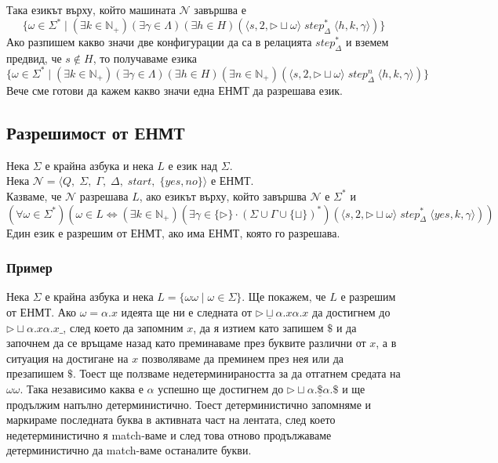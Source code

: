 \documentclass[14pt]{extarticle}
\begin{document}
Така езикът върху, който машината \(\mathcal N\) завършва е
\[ \{ \omega \in \Sigma^* \mid (\exists k \in \mathbb{N}_+)(\exists \gamma \in \Lambda)(\exists h \in H)( \langle s, 2, \triangleright\sqcup\omega \rangle \;step_\Delta^*\; \langle h, k, \gamma \rangle ) \} \]
Ако разпишем какво значи две конфигурации да са в релацията \(step_\Delta^*\) и вземем предвид, че \(s \notin H\), то получаваме езика
\[ \{ \omega \in \Sigma^* \mid (\exists k \in \mathbb{N}_+)(\exists \gamma \in \Lambda)(\exists h \in H)(\exists n \in \mathbb{N}_+)( \langle s, 2, \triangleright\sqcup\omega \rangle \;step_\Delta^n\; \langle h, k, \gamma \rangle ) \} \]
Вече сме готови да кажем какво значи една ЕНМТ да разрешава език.

\subsection*{Разрешимост от ЕНМТ}
Нека \(\Sigma\) е крайна азбука и нека \(L\) е език над \(\Sigma\). \\
Нека \(\mathcal N  = \langle Q,\; \Sigma,\; \Gamma,\; \Delta,\; start,\; \{yes, no\} \rangle\) е ЕНМТ. \\
Казваме, че \(\mathcal N\) разрешава \(L\), ако езикът върху, който завършва \(\mathcal N\) е \(\Sigma^*\) и
\[(\forall \omega \in \Sigma^*)(\omega \in L \iff (\exists k \in \mathbb{N}_+)(\exists \gamma \in \{\triangleright\} \cdot (\Sigma \cup \Gamma \cup \{\sqcup\})^*)(\langle s, 2, \triangleright\sqcup\omega \rangle \;step_\Delta^*\; \langle yes, k, \gamma \rangle) )\]
Един език е разрешим от ЕНМТ, ако има ЕНМТ, която го разрешава.

\subsubsection*{Пример}
Нека \(\Sigma\) е крайна азбука и нека \(L = \{\omega\omega \mid \omega \in \Sigma\}\). Ще покажем, че \(L\) е разрешим от ЕНМТ.
Ако \(\omega = \alpha.x\) идеята ще ни е следната от \(\triangleright \underline{\sqcup} \alpha.x\alpha.x\) да достигнем до \(\triangleright \sqcup \alpha.x\alpha.x\_\), след което да запомним \(x\), да я изтием като запишем \(\$\) и да  започнем да се връщаме назад като преминаваме през буквите различни от \(x\), а в ситуация на достигане на \(x\) позволяваме да преминем през нея или да презапишем \(\$\). Тоест ще ползваме недетерминираността за да отгатнем средата на \(\omega\omega\). Така независимо каква е \(\alpha\) успешно ще достигнем до \(\triangleright \sqcup \alpha.\underline{\$}\alpha.\$\) и ще продължим напълно детерминистично.
Тоест детерминистично запомняме и маркираме последната буква в активната част на лентата, след което недетерминистично я match-ваме и след това отново продължаваме детерминистично да match-ваме останалите букви. \\
\end{document}
